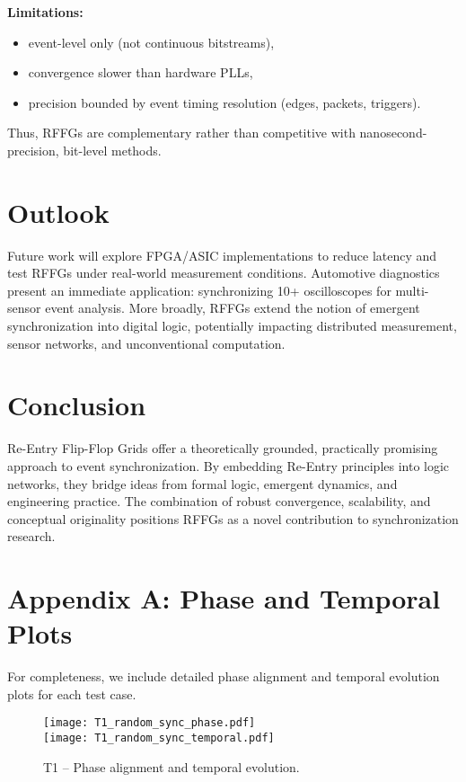 \documentclass[11pt]{article}
\begin{document}
\textbf{Limitations:}
\begin{itemize}
  \item event-level only (not continuous bitstreams),
  \item convergence slower than hardware PLLs,
  \item precision bounded by event timing resolution (edges, packets, triggers).
\end{itemize}

Thus, RFFGs are complementary rather than competitive with nanosecond-precision, bit-level methods.

\section{Outlook}
Future work will explore FPGA/ASIC implementations to reduce latency and test RFFGs under real-world measurement conditions. Automotive diagnostics present an immediate application: synchronizing 10+ oscilloscopes for multi-sensor event analysis. More broadly, RFFGs extend the notion of emergent synchronization into digital logic, potentially impacting distributed measurement, sensor networks, and unconventional computation.

\section{Conclusion}
Re-Entry Flip-Flop Grids offer a theoretically grounded, practically promising approach to event synchronization. By embedding Re-Entry principles into logic networks, they bridge ideas from formal logic, emergent dynamics, and engineering practice. The combination of robust convergence, scalability, and conceptual originality positions RFFGs as a novel contribution to synchronization research.

\appendix
\section*{Appendix A: Phase and Temporal Plots}

For completeness, we include detailed phase alignment and temporal evolution plots for each test case.

\begin{figure}[htbp!]
  \centering
  \texttt{[image: T1\_random\_sync\_phase.pdf]}\\[4pt]
  \texttt{[image: T1\_random\_sync\_temporal.pdf]}
  \caption{T1 -- Phase alignment and temporal evolution.}
\end{figure}
\end{document}
